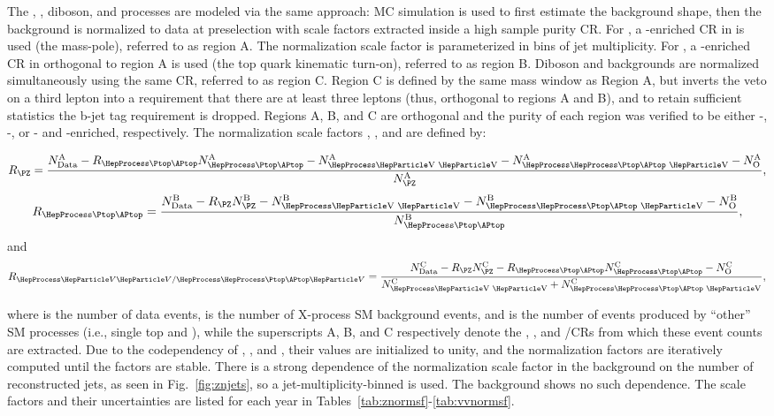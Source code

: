 The \ZJETS, \ttbar, diboson, and \TTV processes are modeled via the same approach: MC simulation is used to first estimate the background shape, then the background is normalized to data at preselection with scale factors extracted inside a high sample purity CR. For \ZJETS, a \PZ-enriched CR in \Muu is used (the \PZ mass-pole), referred to as region A. The \ZJETS normalization scale factor is parameterized in bins of jet multiplicity. For \ttbar, a \ttbar-enriched CR in \Muu orthogonal to region A is used (the top quark kinematic turn-on), referred to as region B. Diboson and \TTV backgrounds are normalized simultaneously using the same CR, referred to as region C. Region C is defined by the same mass window as Region A, but inverts the veto on a third lepton into a requirement that there are at least three leptons (thus, orthogonal to regions A and B), and to retain sufficient statistics the b-jet tag requirement is dropped. Regions A, B, and C are orthogonal and the purity of each region was verified to be either \PZ-, \ttbar-, or \VV- and \TTV-enriched, respectively. The normalization scale factors \RZ, \RTT, and \RVV are defined by:

\begin{equation}
       \RZ = \frac{\NCR{A}{Data} - \RTT\NCR{A}{\ttbar} - \NCR{A}{\VV} - \NCR{A}{\TTV} - \NCR{A}{O}}{\NCR{A}{\PZ}},
\end{equation}
\begin{equation}
       \RTT = \frac{\NCR{B}{Data} - \RZ\NCR{B}{\PZ} - \NCR{B}{\VV} - \NCR{B}{\TTV} - \NCR{B}{O}}{\NCR{B}{\ttbar}},
\end{equation}
and
\begin{equation}
       \RVV = \frac{\NCR{C}{Data} - \RZ\NCR{C}{\PZ} - \RTT\NCR{C}{\ttbar} - \NCR{C}{O}}{\NCR{C}{\VV} + \NCR{C}{\TTV}},
\end{equation}

where  is the number of data events,  is the number of X-process SM background events, and  is the number of events produced by ``other'' SM processes (i.e., single top and \WJETS), while the superscripts A, B, and C respectively denote the \PZ, \ttbar, and \VV/\TTV CRs from which these event counts are extracted. Due to the codependency of \RZ, \RTT, and \RVV, their values are initialized to unity, and the normalization factors are iteratively computed until the factors are stable. There is a strong dependence of the normalization scale factor in the \ZJETS background on the number of reconstructed jets, as seen in Fig.~\ref{fig:znjets}, so a jet-multiplicity-binned \ZJETS is used. The \ttbar background shows no such dependence. The scale factors and their uncertainties are listed for each year in Tables~\ref{tab:znormsf}-\ref{tab:vvnormsf}.


